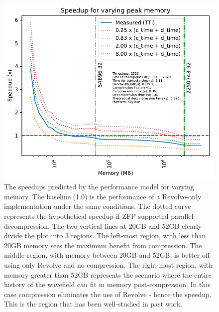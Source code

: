 \documentclass[conference]{IEEEtran}
\begin{document}
\begin{figure}
\begin{center}
\includegraphics[width=\linewidth]{images/varying-memory.pdf}
\end{center}
\caption{The speedups predicted by the performance model for varying
  memory. The baseline
(1.0) is the performance of a Revolve-only implementation under the
same conditions. The dotted curve represents the hypothetical speedup
if ZFP supported parallel decompression. The two vertical lines at 20GB and 52GB clearly
divide the plot into 3 regions. The left-most region, with less than
20GB memory sees the maximum benefit from compression. The middle
region, with memory between 20GB and 52GB, is better off using only
Revolve and no compression. The right-most region, with memory greater
than 52GB represents the scenario where the entire history of the
wavefield can fit in memory post-compression. In this case compression
eliminates the use of Revolve - hence the speedup. This is the region
that has been well-studied in past work.}
\label{fig:varying_memory}
\end{figure}
\end{document}
